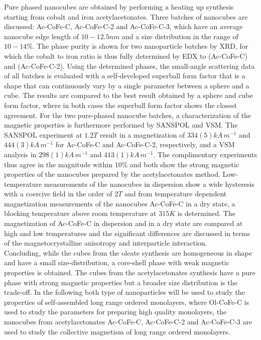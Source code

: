 \documentclass[\main/dresen_thesis.tex]{subfiles}
\begin{document}
  Pure phased nanocubes are obtained by performing a heating up synthesis starting from cobalt and iron acetylacetonates.
  Three batches of nanocubes are discussed: Ac-CoFe-C, Ac-CoFe-C-2 and Ac-CoFe-C-3, which have an average nanocube edge length of $10 - 12.5 \unit{nm}$ and a size distribution in the range of $10 - 14 \%$.
  The phase purity is shown for two nanoparticle batches by XRD, for which the cobalt to iron ratio is thus fully determined by EDX to  (Ac-CoFe-C) and  (Ac-CoFe-C-2).
  Using the determined phases, the small-angle scattering data of all batches is evaluated with a self-developed superball form factor that is a shape that can continuously vary by a single parameter between a sphere and a cube.
  The results are compared to the best result obtained by a sphere and cube form factor, where in both cases the superball form factor shows the closest agreement.
  For the two pure-phased nanocube batches, a characterization of the magnetic properties is furthermore performed by SANSPOL and VSM.
  The SANSPOL experiment at $1.2 \unit{T}$ result in a magnetization of $334(5) \unit{kA \, m^{-1}}$ and $444(3) \unit{kA \, m^{-1}}$ for Ac-CoFe-C and Ac-CoFe-C-2, respectively, and a VSM analysis in $298(1) \unit{kA \, m^{-1}}$ and $413(1) \unit{kA \, m^{-1}}$.
  The complimentary experiments thus agree in the magnitude within $10 \%$ and both show the strong magnetic properties of the nanocubes prepared by the acetylacetonates method.
  Low-temperature measurements of the nanocubes in dispersion show a wide hysteresis with a coercive field in the order of $2 \unit{T}$ and from temperature dependent magnetization measurements of the nanocubes Ac-CoFe-C in a dry state, a blocking temperature above room temperature at $315 \unit{K}$ is determined.
  The magnetization of Ac-CoFe-C in dispersion and in a dry state are compared at high and low temperatures and the significant differences are discussed in terms of the magnetocrystalline anisotropy and interparticle interaction.
  \\

  Concluding, while the cubes from the oleate synthesis are homogeneous in shape and have a small size-distribution, a core-shell phase with weak magnetic properties is obtained.
  The cubes from the acetylacetonates synthesis have a pure phase with strong magnetic properties but a broader size distribution is the trade-off.
  In the following both type of nanoparticles will be used to study the properties of self-assembled long range ordered monolayers, where Ol-CoFe-C is used to study the parameters for preparing high quality monolayers, the nanocubes from acetylacetonates Ac-CoFe-C, Ac-CoFe-C-2 and Ac-CoFe-C-3 are used to study the collective magnetism of long range ordered monolayers.
\end{document}
